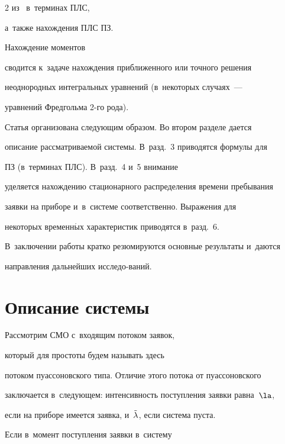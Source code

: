 \begin{multicols}{2}
из~\cite{lataavrv} в~терминах ПЛС,


а~также нахождения ПЛС ПЗ.


Нахождение моментов


сводится к~задаче нахождения приближенного или точного решения


неоднородных интегральных уравнений (в~некоторых случаях~---


уравнений Фредгольма 2-го рода).





Статья организована следующим образом. Во втором разделе дается


описание рассматриваемой системы. В~разд.~3 приводятся формулы для


ПЗ (в~терминах ПЛС). В~разд.~4 и~5 внимание


уделяется нахождению стационарного распределения времени пребывания


заявки на приборе и~в~системе соответственно. Выражения для


некоторых временн$\acute{\mbox{ы}}$х характеристик приводятся в~разд.~6.


В~заключении работы кратко резюмируются основные результаты и~даются


направления дальнейших исследо-\linebreak ваний.





\vspace*{-6pt}





\section{Описание системы}





Рассмотрим СМО с~входящим потоком заявок,


который для простоты будем называть здесь


потоком пуассоновского типа. Отличие этого потока от пуассоновского


заключается в~следующем: интенсивность поступления заявки равна~$\la$,


если на приборе имеется заявка, и~$\tilde\lambda$, если система пуста.





Если в~момент поступления заявки в~систему



\end{multicols}
